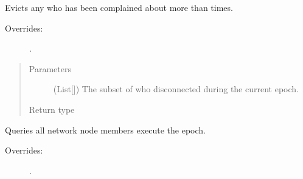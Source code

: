 \documentclass[letterpaper,10pt,english]{sphinxmanual}
\begin{document}
\begin{fulllineitems}
\begin{fulllineitems}
\label{\detokenize{app.domain:app.domain.cluster_groups.SGClusterExt.maintain}}
Evicts any {\hyperref[\detokenize{app.domain:app.domain.network_nodes.SGNodeExt}]{}} who has
been complained about more than {\hyperref[\detokenize{app.domain:app.domain.cluster_groups.SGClusterExt.complaint_threshold}]{}} times.
\begin{description}
\item[{Overrides:}] \leavevmode
{\hyperref[\detokenize{app.domain:app.domain.cluster_groups.Cluster.maintain}]{}}.

\end{description}
\begin{quote}\begin{description}
\item[{Parameters}] \leavevmode
{} (List{[}{\hyperref[\detokenize{app:app.type_hints.NodeType}]{}}{]}) \textendash{} The subset of {\hyperref[\detokenize{app.domain:app.domain.cluster_groups.Cluster.members}]{}} who disconnected
during the current epoch.

\item[{Return type}] \leavevmode
{}

\end{description}\end{quote}

\end{fulllineitems}


\begin{fulllineitems}
\label{\detokenize{app.domain:app.domain.cluster_groups.SGClusterExt.nodes_execute}}
Queries all network node members execute the epoch.
\begin{description}
\item[{Overrides:}] \leavevmode
{\hyperref[\detokenize{app.domain:app.domain.cluster_groups.SGCluster.nodes_execute}]{}}.


\end{description}
\end{fulllineitems}
\end{fulllineitems}
\end{document}
